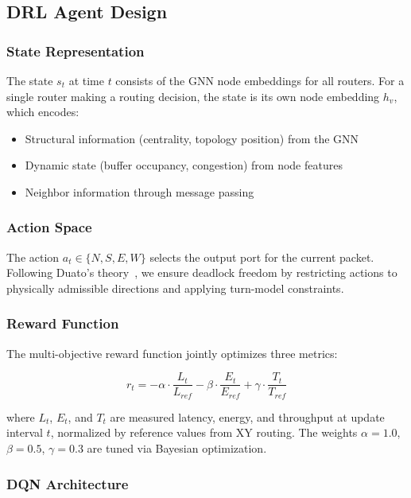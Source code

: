 \subsection{DRL Agent Design}

\subsubsection{State Representation}

The state $s_t$ at time $t$ consists of the GNN node embeddings for all routers. For a single router making a routing decision, the state is its own node embedding $h_v$, which encodes:
\begin{itemize}
    \item Structural information (centrality, topology position) from the GNN
    \item Dynamic state (buffer occupancy, congestion) from node features
    \item Neighbor information through message passing
\end{itemize}

\subsubsection{Action Space}

The action $a_t \in \{N, S, E, W\}$ selects the output port for the current packet. Following Duato's theory~\cite{duato1996}, we ensure deadlock freedom by restricting actions to physically admissible directions and applying turn-model constraints.

\subsubsection{Reward Function}

The multi-objective reward function jointly optimizes three metrics:

\begin{equation}
r_t = -\alpha \cdot \frac{L_t}{L_{ref}} - \beta \cdot \frac{E_t}{E_{ref}} + \gamma \cdot \frac{T_t}{T_{ref}}
\end{equation}

where $L_t$, $E_t$, and $T_t$ are measured latency, energy, and throughput at update interval $t$, normalized by reference values from XY routing. The weights $\alpha = 1.0$, $\beta = 0.5$, $\gamma = 0.3$ are tuned via Bayesian optimization.

\subsubsection{DQN Architecture}

